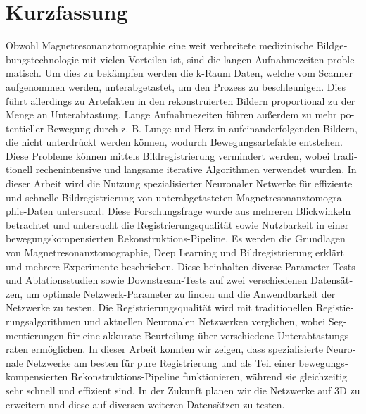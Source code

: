 \chapter*{Kurzfassung}
\begin{otherlanguage}{ngerman}
Obwohl Magnetresonanztomographie eine weit verbreitete medizinische Bildgebungstechnologie mit vielen Vorteilen ist, sind die langen Aufnahmezeiten problematisch. Um dies zu bekämpfen werden die k-Raum Daten, welche vom Scanner aufgenommen werden, unterabgetastet, um den Prozess zu beschleunigen. Dies führt allerdings zu Artefakten in den rekonstruierten Bildern proportional zu der Menge an Unterabtastung. Lange Aufnahmezeiten führen außerdem zu mehr potentieller Bewegung durch z. B. Lunge und Herz in aufeinanderfolgenden Bildern, die nicht unterdrückt werden können, wodurch Bewegungsartefakte entstehen. Diese Probleme können mittels Bildregistrierung vermindert werden, wobei traditionell rechenintensive und langsame iterative Algorithmen verwendet wurden. In dieser Arbeit wird die Nutzung spezialisierter Neuronaler Netwerke für effiziente und schnelle Bildregistrierung von unterabgetasteten Magnetresonanztomographie-Daten untersucht. Diese Forschungsfrage wurde aus mehreren Blickwinkeln betrachtet und untersucht die Registrierungsqualität sowie Nutzbarkeit in einer bewegungskompensierten Rekonstruktions-Pipeline. Es werden die Grundlagen von Magnetresonanztomographie, Deep Learning und Bildregistrierung erklärt und mehrere Experimente beschrieben. Diese beinhalten diverse Parameter-Tests und Ablationsstudien sowie Downstream-Tests auf zwei verschiedenen Datensätzen, um optimale Netzwerk-Parameter zu finden und die Anwendbarkeit der Netzwerke zu testen. Die Registrierungsqualität wird mit traditionellen Registierungsalgorithmen und aktuellen Neuronalen Netzwerken verglichen,  wobei Segmentierungen für eine akkurate Beurteilung über verschiedene Unterabtastungsraten ermöglichen. In dieser Arbeit konnten wir zeigen, dass spezialisierte Neuronale Netzwerke am besten für pure Registrierung und als Teil einer bewegungskompensierten Rekonstruktions-Pipeline funktionieren, während sie gleichzeitig sehr schnell und effizient sind. In der Zukunft planen wir die Netzwerke auf 3D zu erweitern und diese auf diversen weiteren Datensätzen zu testen.
\end{otherlanguage}